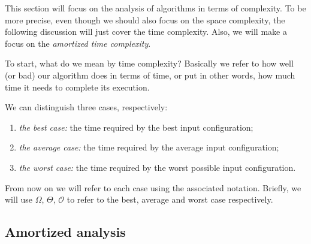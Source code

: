 \documentclass{subfiles}
\begin{document}
    This section will focus on the analysis of algorithms in terms of complexity.
    To be more precise, even though we should also focus on the space complexity,
    the following discussion will just cover the time complexity.
    Also, we will make a focus on the \emph{amortized time complexity}.

    To start, what do we mean by time complexity? 
    Basically we refer to how well (or bad) our algorithm does in terms of time,
    or put in other words, how much time it needs to complete its execution.

    We can distinguish three cases, respectively:
    \begin{enumerate}
        \item \emph{the best case:} the time required by the best input configuration;
        \item \emph{the average case:} the time required by the average input configuration;
        \item \emph{the worst case:} the time required by the worst possible input configuration.
    \end{enumerate} 
    \begin{remark*}
        From now on we will refer to each case using the associated notation.
        Briefly, we will use \(\Omega\), \(\Theta\), \(\mathcal{O}\) to refer to the 
        best, average and worst case respectively\footnotemark[1].
    \end{remark*}

    \subsection{Amortized analysis}
    

\end{document}

